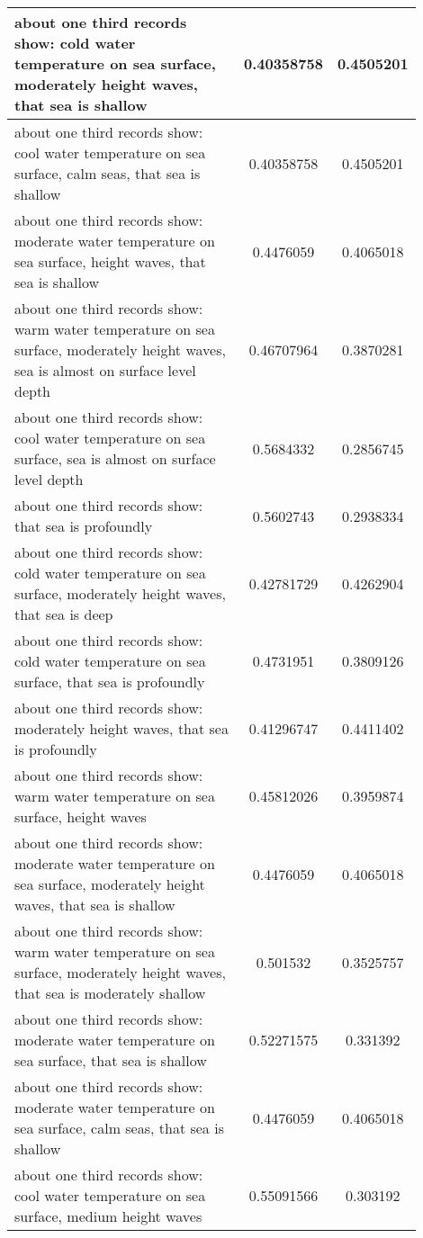 \documentclass{article}
\begin{document}
\begin{longtable}{|p{0.9\linewidth}|c|c|}
about one third records show: cold water temperature on sea surface, moderately height waves, that sea is shallow & 0.40358758 & 0.4505201 \\ \hline
about one third records show: cool water temperature on sea surface, calm seas, that sea is shallow & 0.40358758 & 0.4505201 \\ \hline
about one third records show: moderate water temperature on sea surface, height waves, that sea is shallow & 0.4476059 & 0.4065018 \\ \hline
about one third records show: warm water temperature on sea surface, moderately height waves, sea is almost on surface level depth & 0.46707964 & 0.3870281 \\ \hline
about one third records show: cool water temperature on sea surface, sea is almost on surface level depth & 0.5684332 & 0.2856745 \\ \hline
about one third records show: that sea is profoundly & 0.5602743 & 0.2938334 \\ \hline
about one third records show: cold water temperature on sea surface, moderately height waves, that sea is deep & 0.42781729 & 0.4262904 \\ \hline
about one third records show: cold water temperature on sea surface, that sea is profoundly & 0.4731951 & 0.3809126 \\ \hline
about one third records show: moderately height waves, that sea is profoundly & 0.41296747 & 0.4411402 \\ \hline
about one third records show: warm water temperature on sea surface, height waves & 0.45812026 & 0.3959874 \\ \hline
about one third records show: moderate water temperature on sea surface, moderately height waves, that sea is shallow & 0.4476059 & 0.4065018 \\ \hline
about one third records show: warm water temperature on sea surface, moderately height waves, that sea is moderately shallow & 0.501532 & 0.3525757 \\ \hline
about one third records show: moderate water temperature on sea surface, that sea is shallow & 0.52271575 & 0.331392 \\ \hline
about one third records show: moderate water temperature on sea surface, calm seas, that sea is shallow & 0.4476059 & 0.4065018 \\ \hline
about one third records show: cool water temperature on sea surface, medium height waves & 0.55091566 & 0.303192 \\ \hline

\end{longtable}
\end{document}
